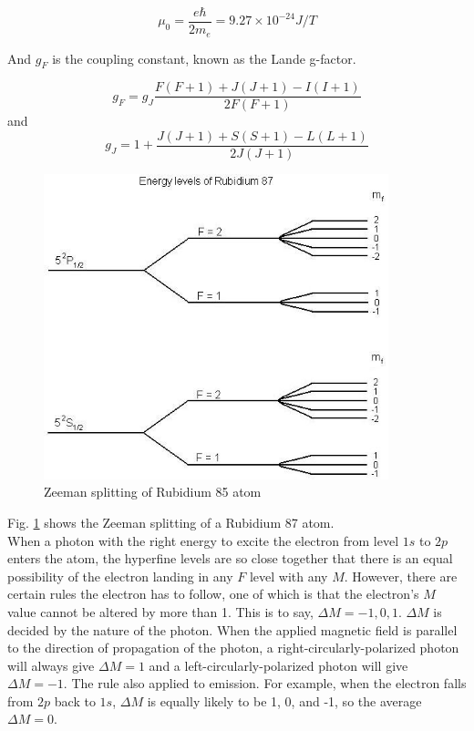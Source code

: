 \documentclass[prb,preprint]{revtex4-1}
\begin{document}
\begin{equation}
\mu_{0}=\frac{e\hbar}{2m_{e}}=9.27\times10^{-24} J/T
\label{mu0}
\end{equation}

And $g_{F}$ is the coupling constant, known as the Lande g-factor. 

\begin{equation}
g_{F}=g_{J} \frac{F(F+1)+J(J+1)-I(I+1)}{2F(F+1)}
\label{gf}
\end{equation}
and
\begin{equation}
g_{J}=1+\frac{J(J+1)+S(S+1)-L(L+1)}{2J(J+1)}
\label{gj}
\end{equation}

\begin{figure}[h]
\centering
\includegraphics[width=10cm]{energylevels.jpg}
\caption{Zeeman splitting of Rubidium 85 atom \cite{energy}}
\label{energylevels}
\end{figure}

Fig. \ref{energylevels} shows the Zeeman splitting of a Rubidium 87 atom. \\

When a photon with the right energy to excite the electron from level $1s$ to $2p$ enters the atom, the hyperfine levels are so close together that there is an equal possibility of the electron landing in any $F$ level with any $M$. However, there are certain rules the electron has to follow, one of which is that the electron's $M$ value cannot be altered by more than 1. This is to say, $\Delta M=-1, 0, 1$. $\Delta M$ is decided by the nature of the photon. When the applied magnetic field is parallel to the direction of propagation of the photon, a right-circularly-polarized photon will always give $\Delta M=1$ and a left-circularly-polarized photon will give $\Delta M=-1$. The rule also applied to emission. For example, when the electron falls from $2p$ back to $1s$, $\Delta M$ is equally likely to be 1, 0, and -1, so the average $\Delta M=0$. \\
\end{document}
